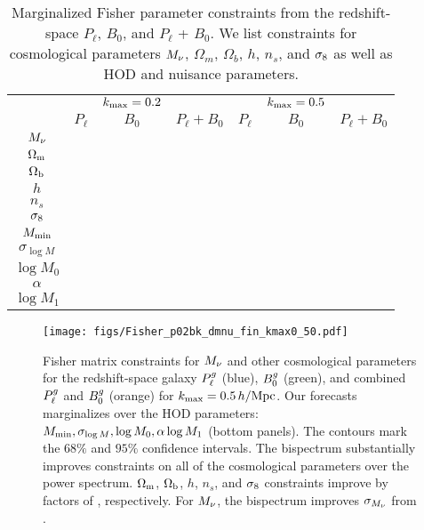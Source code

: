 \begin{table}
    \caption{Marginalized Fisher parameter constraints from the redshift-space 
    $P_\ell$, $B_0$, and $P_\ell$ + $B_0$. We list constraints for cosmological 
    parameters $M_\nu$, $\Omega_m$, $\Omega_b$, $h$, $n_s$, and $\sigma_8$ as well 
    as HOD and nuisance parameters.} 
\begin{center} 
    \begin{tabular}{c|ccc|ccc} \toprule
        & & $k_{\rm max}=0.2$ & & & $k_{\rm max}=0.5$ & \\
        & $P_\ell$ & $B_0$ & $P_\ell + B_0$ & $P_\ell$ & $B_0$ & $P_\ell + B_0$ \\[3pt]
\hline 
$M_\nu$     & & & \\
$\Omega_{\rm m}$       & & & \\
$\Omega_{\rm b}$       & & & \\
$h$         & & & \\
$n_s$       & & & \\
$\sigma_8$      & & & \\[3pt] \hline
$M_{\rm min}$       & & & \\
$\sigma_{\log M}$   & & & \\ 
$\log M_0$          & & & \\
$\alpha$            & & & \\ 
$\log M_1$          & & & \\ [3pt]
\hline            
\end{tabular} \label{tab:forecast}
\end{center}
\end{table}

\begin{figure}
    \begin{center}
        \texttt{[image: figs/Fisher\_p02bk\_dmnu\_fin\_kmax0\_50.pdf]}
        \caption{Fisher matrix constraints for $M_\nu$ and other cosmological
        parameters for the redshift-space galaxy $P^g_{\ell}$ (blue), $B^g_0$
        (green), and combined $P^g_{\ell}$ and $B^g_0$ (orange) for $k_{\rm max} =
        0.5\,h/\mathrm{Mpc}$. Our forecasts marginalizes over the \cite{zheng2007}
        HOD parameters: $M_{\rm min}, \sigma_{\log M}, \log M_0, \alpha \log
        M_1$ (bottom panels). The contours mark the $68\%$ and $95\%$
        confidence intervals. The bispectrum substantially improves
        constraints on all of the cosmological parameters over the power
        spectrum. $\Omega_{\rm m}$, $\Omega_{\rm b}$, $h$, $n_s$, and $\sigma_8$ constraints improve by factors
        of , respectively. For $M_\nu$, the
        bispectrum improves $\sigma_{M_\nu}$ from .
        }
        \label{fig:forecast}
    \end{center}
\end{figure}

